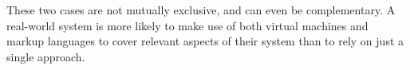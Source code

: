\documentclass{sig-alternate}
\begin{document}
These two cases are not mutually exclusive, and can even be complementary. A real-world system is more likely to make use of both virtual machines and markup languages to cover relevant aspects of their system than to rely on just a single approach.










  
\end{document}
